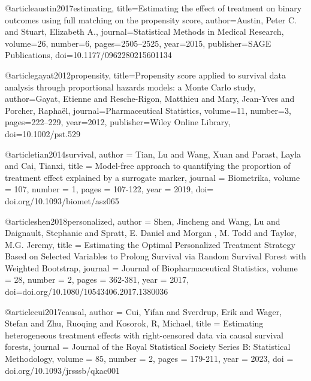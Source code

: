 @article{austin2017estimating,
  title={Estimating the effect of treatment on binary outcomes using full matching on the propensity score},
  author={Austin, Peter C. and Stuart, Elizabeth A.},
  journal={Statistical Methods in Medical Research},
  volume={26},
  number={6},
  pages={2505--2525},
  year={2015},
  publisher={SAGE Publications},
  doi={10.1177/0962280215601134}
}





@article{gayat2012propensity,
  title={Propensity score applied to survival data analysis through proportional hazards models: a Monte Carlo study},
  author={Gayat, Etienne and Resche-Rigon, Matthieu and Mary, Jean-Yves and Porcher, Raphaël},
  journal={Pharmaceutical Statistics},
  volume={11},
  number={3},
  pages={222--229},
  year={2012},
  publisher={Wiley Online Library},
  doi={10.1002/pst.529}
}






@article{tian2014survival,
  author = {Tian, Lu and Wang, Xuan and Parast, Layla and Cai, Tianxi},
  title = {Model-free approach to quantifying the proportion of treatment effect explained by a surrogate marker},
  journal = {Biometrika},
  volume = {107},
  number = {1},
  pages = {107-122},
  year = {2019},
  doi= {doi.org/10.1093/biomet/asz065}
}





@article{shen2018personalized,
  author = {Shen, Jincheng and Wang, Lu and Daignault, Stephanie and Spratt, E. Daniel and Morgan , M. Todd and Taylor, M.G. Jeremy},
  title = {Estimating the Optimal Personalized Treatment Strategy Based on Selected Variables to Prolong Survival via Random Survival Forest with Weighted Bootstrap},
  journal = {Journal of Biopharmaceutical Statistics},
  volume = {28},
  number = {2},
  pages = {362-381},
  year = {2017},
  doi={doi.org/10.1080/10543406.2017.1380036}
}





@article{cui2017causal,
  author = {Cui, Yifan and Sverdrup, Erik and Wager, Stefan and Zhu, Ruoqing and Kosorok, R, Michael},
  title = {Estimating heterogeneous treatment effects with right-censored data via causal survival forests},
  journal = {Journal of the Royal Statistical Society Series B: Statistical Methodology},
  volume = {85},
  number = {2},
  pages = {179-211},
  year = {2023},
  doi = {doi.org/10.1093/jrsssb/qkac001}
}






